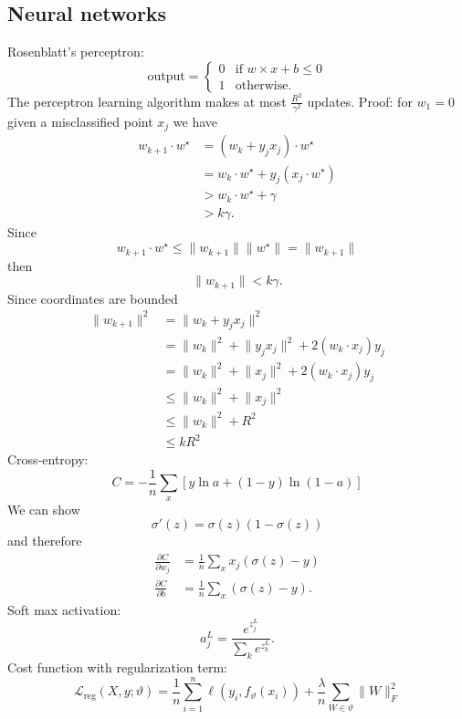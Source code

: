 \documentclass[a4paper,9pt]{extarticle}
\begin{document}
\begin{multicols*}{2}
\section{Neural networks}
Rosenblatt's perceptron:
\begin{equation*}
	\text{output}=\begin{cases}
		0&\text{if }w\times x+b\leq 0\\
		1&\text{otherwise}.
	\end{cases}
\end{equation*}
The perceptron learning algorithm makes at most $\frac{R^{2}}{\gamma^{2}}$ updates. Proof: for $w_{1}=0$ given a misclassified point $x_{j}$ we have
\begin{align*}
	w_{k+1}\cdot w^{\star}&=(w_{k}+y_{j}x_{j})\cdot w^{\star}\\
	&=w_{k}\cdot w^{\star}+y_{j}(x_{j}\cdot w^{\star})\\
	&>w_{k}\cdot w^{\star}+\gamma\\
	&>k\gamma.
\end{align*}
Since 
\begin{equation*}
	w_{k+1}\cdot w^{\star}\leq\lVert w_{k+1}\rVert\lVert w^{\star}\rVert=\lVert w_{k+1}\rVert
\end{equation*}
then
\begin{equation*}
	\lVert w_{k+1}\rVert<k\gamma.
\end{equation*}
Since coordinates are bounded
\begin{align*}
	\lVert w_{k+1}\rVert^{2}&=\lVert w_{k}+y_{j}x_{j}\rVert^{2}\\
	&=\lVert w_{k}\rVert^{2}+\lVert y_{j}x_{j}\rVert^{2}+2(w_{k}\cdot x_{j})y_{j}\\
	&=\lVert w_{k}\rVert^{2}+\lVert x_{j}\rVert^{2}+2(w_{k}\cdot x_{j})y_{j}\\
	&\leq\lVert w_{k}\rVert^{2}+\lVert x_{j}\rVert^{2}\\
	&\leq\lVert w_{k}\rVert^{2}+R^{2}\\
	&\leq k{R}^{2}
\end{align*}
Cross-entropy: 
\begin{equation*}
	C=-\frac{1}{n}\sum_{x}\left[y\ln a+(1-y)\ln(1-a)\right]
\end{equation*}
We can show
\begin{equation*}
	\sigma'(z)=\sigma(z)(1-\sigma(z))
\end{equation*}
and therefore
\begin{align*}
	\frac{\partial C}{\partial w_{j}}&=\frac{1}{n}\sum_{x}x_{j}(\sigma(z)-y)\\
	\frac{\partial C}{\partial b}&=\frac{1}{n}\sum_{x}(\sigma(z)-y).
\end{align*}
Soft max activation:
\begin{equation*}
	a^{L}_{j}=\frac{e^{z_{j}^{L}}}{\sum_{k}e^{z_{k}^{L}}}.
\end{equation*}
Cost function with regularization term:
\begin{equation*}
	\mathcal{L}_{\text{reg}}(X,y;\vartheta)=\frac{1}{n}\sum_{i=1}^{n}\ell(y_{i},f_{\vartheta}(x_{i}))+\frac{\lambda}{n}\sum_{W\in\vartheta}\lVert W\rVert^{2}_{F}
\end{equation*}

\end{multicols*}
\end{document}
